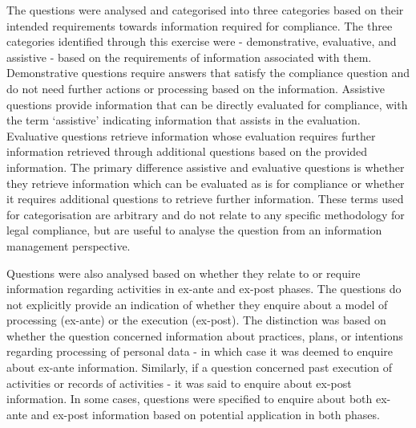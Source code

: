 The questions were analysed and categorised into three categories based on their intended requirements towards information required for compliance. The three categories identified through this exercise were - demonstrative, evaluative, and assistive - based on the requirements of information associated with them. 
Demonstrative questions require answers that satisfy the compliance question and do not need further actions or processing based on the information. 
Assistive questions provide information that can be directly evaluated for compliance, with the term `assistive' indicating information that assists in the evaluation.
Evaluative questions retrieve information whose evaluation requires further information retrieved through additional questions based on the provided information.
The primary difference assistive and evaluative questions is whether they retrieve information which can be evaluated as is for compliance or whether it requires additional questions to retrieve further information.
These terms used for categorisation are arbitrary and do not relate to any specific methodology for legal compliance, but are useful to analyse the question from an information management perspective.

Questions were also analysed based on whether they relate to or require information regarding activities in ex-ante and ex-post phases.
The questions do not explicitly provide an indication of whether they enquire about a model of processing (ex-ante) or the execution (ex-post). The distinction was based on whether the question concerned information about practices, plans, or intentions regarding processing of personal data - in which case it was deemed to enquire about ex-ante information.
Similarly, if a question concerned past execution of activities or records of activities - it was said to enquire about ex-post information.
In some cases, questions were specified to enquire about both ex-ante and ex-post information based on potential application in both phases.

